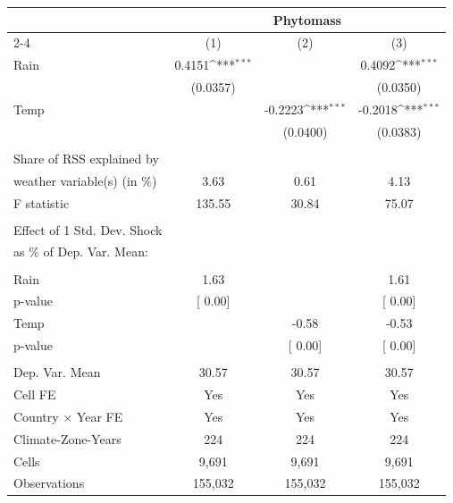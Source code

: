 {
\def\sym#1{\ifmmode^{#1}\else\(^{#1}\)\fi}
\begin{tabular}{l*{3}{c}}
\toprule
                    &\multicolumn{3}{c}{Phytomass}                  \\\cmidrule(lr){2-4}
                    &\multicolumn{1}{c}{(1)}         &\multicolumn{1}{c}{(2)}         &\multicolumn{1}{c}{(3)}         \\
\midrule
Rain                &0.4151\sym{***}&               &0.4092\sym{***}\\
                    &(0.0357)         &               &(0.0350)         \\
\addlinespace
Temp                &               &-0.2223\sym{***}&-0.2018\sym{***}\\
                    &               &(0.0400)         &(0.0383)         \\
\midrule
\\ Share of RSS explained by  \\ weather variable(s) (in \%)&  3.63         &  0.61         &  4.13         \\
[1em] F statistic   &135.55         & 30.84         & 75.07         \\
\hline \\  Effect of 1 Std. Dev. Shock \\ as $\%$ of Dep. Var. Mean:&               &               &               \\
\\ Rain             &  1.63         &               &  1.61         \\
p-value             &[     0.00]         &               &[     0.00]         \\
[1em] Temp          &               & -0.58         & -0.53         \\
p-value             &               &[     0.00]         &[     0.00]         \\
\hline \\ Dep. Var. Mean& 30.57         & 30.57         & 30.57         \\
Cell FE             &   Yes         &   Yes         &   Yes         \\
Country $\times$ Year FE&   Yes         &   Yes         &   Yes         \\
Climate-Zone-Years  &   224         &   224         &   224         \\
Cells               & 9,691         & 9,691         & 9,691         \\
Observations        &155,032         &155,032         &155,032         \\
\bottomrule
\end{tabular}
}
